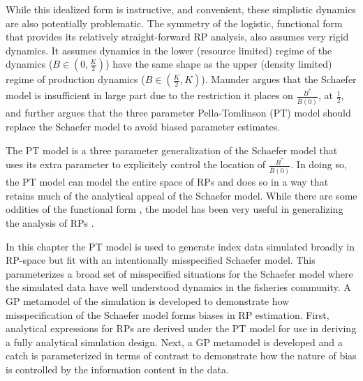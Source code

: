 %
While this idealized form is instructive, and convenient, these simplistic 
dynamics are also potentially problematic. The symmetry of the logistic, 
functional form that provides its relatively straight-forward RP analysis, also 
assumes very rigid dynamics. It assumes dynamics in the lower 
(resource limited) regime of the dynamics ($B\in(0, \frac{K}{2})$) 
have the same shape as the upper (density limited) regime of production 
dynamics ($B\in(\frac{K}{2}, K)$). 
Maunder \cite{maunder_is_2003} argues that the Schaefer model is
insufficient in large part due to the restriction it places on $\frac{B^*}{\bar B(0)}$,
at $\frac{1}{2}$, and further argues that the three parameter Pella-Tomlinson
(PT) model \cite{pella_generalized_1969} should replace the Schaefer model to 
avoid biased parameter estimates.


%
The PT model is a three parameter generalization of the Schaefer model that uses 
its extra parameter to explicitely control the location of $\frac{B^*}{\bar B(0)}$. 
In doing so, the PT model can model the entire space of RPs and does so in a way that 
retains much of the analytical appeal of the Schaefer model. While there are some oddities
of the functional form \cite{punt_extending_2019, fletcher_restructuring_1978}, the model 
has been very useful in generalizing the analysis of RPs \cite{winker_jabba_2018}.  

%
In this chapter the PT model is used to generate index data simulated broadly 
in RP-space but fit with an intentionally misspecified Schaefer model. This 
parameterizes a broad set of misspecified situations for the Schaefer model 
where the simulated data have well understood dynamics in the fisheries 
community. A GP metamodel of the simulation is developed to demonstrate how 
misspecification of the Schaefer model forms biases in RP estimation. First, 
analytical expressions for RPs are derived under the PT model for use in 
deriving a fully analytical simulation design. Next, a GP metamodel is 
developed and a catch is parameterized in terms of contrast to demonstrate 
how the nature of bias is controlled by the information content in the data.

